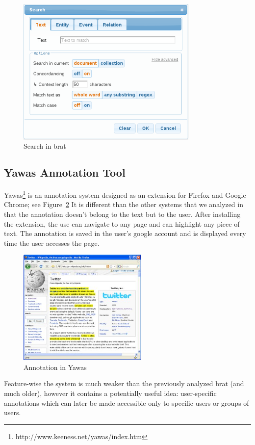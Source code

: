 \begin{figure}[ht]
  \includegraphics[width=3.5in]{figures/brat-search}
  \caption{Search in brat}\label{fig:brat-search}
\end{figure}
\subsection{Yawas Annotation Tool} 
Yawas\footnote{http://www.keeness.net/yawas/index.htm} is an annotation system designed as
an extension for Firefox and Google Chrome; see Figure~\ref{fig:yawas}
It is different than the other systems that we analyzed in that the annotation doesn't
belong to the text but to the user. After installing the extension, the use can navigate
to any page and can highlight any piece of text. The annotation is saved in the user's
google account and is displayed every time the user accesses the page.\vspace{10pt}

\begin{figure}[ht]
  \includegraphics[width=2.5in]{figures/yawas}
  \caption{Annotation in Yawas}\label{fig:yawas}
\end{figure}

Feature-wise the system is much weaker than the previously analyzed brat (and much older),
however it contains a potentially useful idea: user-specific annotations which can later
be made accessible only to specific users or groups of users.


